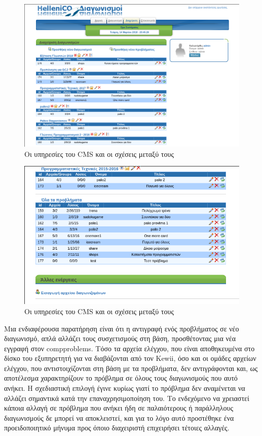 \documentclass[diploma]{softlab-thesis}
\begin{document}
\bigskip

\begin{figure}
  \centering
  \includegraphics[scale=0.4,trim=4 4 4 4,clip]{Figures/aftersep.png}
  \caption[Η αρχιτεκτονική του CMS]{Οι υπηρεσίες του CMS και οι σχέσεις μεταξύ τους}
\end{figure}

\begin{figure}
  \centering
  \includegraphics[scale=0.4,trim=4 4 4 4,clip]{Figures/aftersepall.png}
  \caption[Η αρχιτεκτονική του CMS]{Οι υπηρεσίες του CMS και οι σχέσεις μεταξύ τους}
\end{figure}

\bigskip

Μια ενδιαφέρουσα παρατήρηση είναι ότι η αντιγραφή ενός προβλήματος σε νέο
διαγωνισμό, απλά αλλάζει τους συσχετισμούς στη βάση, προσθέτοντας μια νέα
εγγραφή στον compproblems. Τόσο τα αρχεία ελέγχου, που είναι αποθηκευμένα στο
δίσκο του εξυπηρετητή για να διαβάζονται από τον Kewii, όσο και οι ομάδες
αρχείων ελέγχου, που αντιστοιχίζονται στη βάση με τα προβλήματα, δεν
αντιγράφονται και, ως αποτέλεσμα χαρακτηρίζουν το πρόβλημα σε όλους τους
διαγωνισμούς που αυτό ανήκει. Η σχεδιαστική επιλογή έγινε κυρίως γιατί το
πρόβλημα δεν αναμένεται να αλλάζει σημαντικά κατά την επαναχρησιμοποίηση του.
Το ενδεχόμενο να χρειαστεί κάποια αλλαγή σε πρόβλημα που ανήκει ήδη σε
παλαιότερους ή παράλληλους διαγωνισμούς δε μπορεί να αποκλειστεί, και για το
λόγο αυτό προστέθηκε ένα προειδοποιητικό μήνυμα προς όποιο διαχειριστή
επιχειρήσει τέτοιες αλλαγές.
\end{document}
